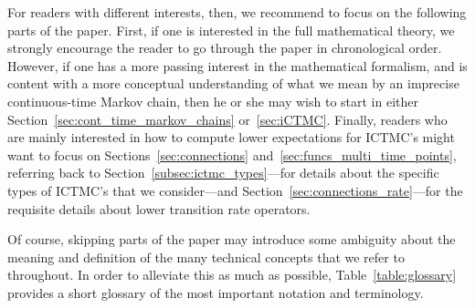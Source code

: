 \documentclass[10pt,a4paper]{paper}
\theoremstyle{definition}
\begin{document}
For readers with different interests, then, we recommend to focus on the following parts of the paper. First, if one is interested in the full mathematical theory, we strongly encourage the reader to go through the paper in chronological order. However, if one has a more passing interest in the mathematical formalism, and is content with a more conceptual understanding of what we mean by an imprecise continuous-time Markov chain, then he or she may wish to start in either Section~\ref{sec:cont_time_markov_chains} or~\ref{sec:iCTMC}. Finally, readers who are mainly interested in how to compute lower expectations for ICTMC's might want to focus on Sections~\ref{sec:connections} and~\ref{sec:funcs_multi_time_points}, referring back to Section~\ref{subsec:ictmc_types}---for details about the specific types of ICTMC's that we consider---and Section~\ref{sec:connections_rate}---for the requisite details about lower transition rate operators.

Of course, skipping parts of the paper may introduce some ambiguity about the meaning and definition of the many technical concepts that we refer to throughout. In order to alleviate this as much as possible, Table~\ref{table:glossary} provides a short glossary of the most important notation and terminology.
\end{document}
